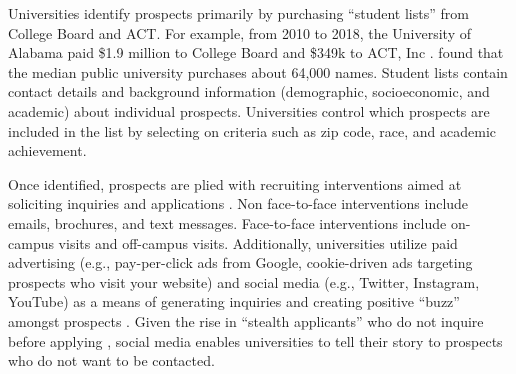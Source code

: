 \documentclass[twoside]{article}
\begin{document}


Universities identify prospects primarily by purchasing ``student lists'' from College Board and ACT. For example, from 2010 to 2018, the University of Alabama paid \$1.9 million to College Board and \$349k to ACT, Inc \citep{RN4035}. \cite{RN4314} found that the median public university purchases about 64,000 names. Student lists contain contact details and background information (demographic, socioeconomic, and academic) about individual prospects. Universities control which prospects are included in the list by selecting on criteria such as zip code, race, and academic achievement.

Once identified, prospects are plied with recruiting interventions aimed at soliciting inquiries and applications \citep{RN4323}. Non face-to-face interventions include emails, brochures, and text messages.  Face-to-face interventions include on-campus visits and off-campus visits. Additionally, universities utilize paid advertising (e.g., pay-per-click ads from Google, cookie-driven ads targeting prospects who visit your website) and social media (e.g., Twitter, Instagram, YouTube) as a means of generating inquiries and creating positive ``buzz'' amongst prospects \citep{RN4134}. Given the rise in ``stealth applicants'' who do not inquire before applying \citep{RN4411}, social media enables universities to tell their story to prospects who do not want to be contacted.
\end{document}
